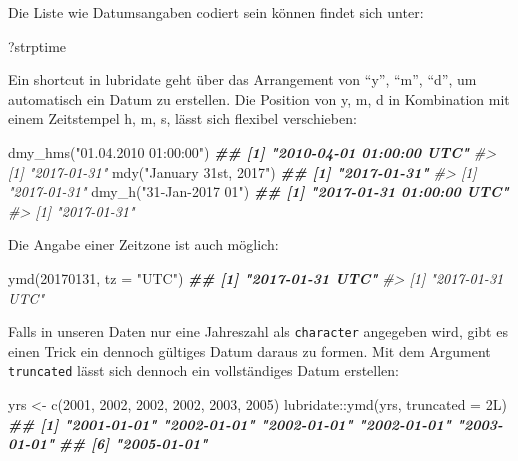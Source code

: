 \documentclass[
]{article}
\newenvironment{Shaded}{\begin{snugshade}}{\end{snugshade}}
\newcommand{\AttributeTok}[1]{\textcolor[rgb]{0.77,0.63,0.00}{#1}}
\newcommand{\CommentTok}[1]{\textcolor[rgb]{0.56,0.35,0.01}{\textit{#1}}}
\newcommand{\DecValTok}[1]{\textcolor[rgb]{0.00,0.00,0.81}{#1}}
\newcommand{\DocumentationTok}[1]{\textcolor[rgb]{0.56,0.35,0.01}{\textbf{\textit{#1}}}}
\newcommand{\FunctionTok}[1]{\textcolor[rgb]{0.00,0.00,0.00}{#1}}
\newcommand{\NormalTok}[1]{#1}
\newcommand{\OtherTok}[1]{\textcolor[rgb]{0.56,0.35,0.01}{#1}}
\newcommand{\SpecialCharTok}[1]{\textcolor[rgb]{0.00,0.00,0.00}{#1}}
\newcommand{\StringTok}[1]{\textcolor[rgb]{0.31,0.60,0.02}{#1}}
\begin{document}
Die Liste wie Datumsangaben codiert sein können findet sich unter:

\begin{Shaded}
\begin{Highlighting}[]
\NormalTok{?strptime}
\end{Highlighting}
\end{Shaded}

Ein shortcut in lubridate geht über das Arrangement von ``y'', ``m'', ``d'', um automatisch ein Datum zu erstellen. Die Position von y, m, d in Kombination mit einem Zeitstempel h, m, s, lässt sich flexibel verschieben:

\begin{Shaded}
\begin{Highlighting}[]
\FunctionTok{dmy\_hms}\NormalTok{(}\StringTok{"01.04.2010 01:00:00"}\NormalTok{)}
\DocumentationTok{\#\# [1] "2010{-}04{-}01 01:00:00 UTC"}
\CommentTok{\#\textgreater{} [1] "2017{-}01{-}31"}
\FunctionTok{mdy}\NormalTok{(}\StringTok{"January 31st, 2017"}\NormalTok{)}
\DocumentationTok{\#\# [1] "2017{-}01{-}31"}
\CommentTok{\#\textgreater{} [1] "2017{-}01{-}31"}
\FunctionTok{dmy\_h}\NormalTok{(}\StringTok{"31{-}Jan{-}2017 01"}\NormalTok{)}
\DocumentationTok{\#\# [1] "2017{-}01{-}31 01:00:00 UTC"}
\CommentTok{\#\textgreater{} [1] "2017{-}01{-}31"}
\end{Highlighting}
\end{Shaded}

Die Angabe einer Zeitzone ist auch möglich:

\begin{Shaded}
\begin{Highlighting}[]
\FunctionTok{ymd}\NormalTok{(}\DecValTok{20170131}\NormalTok{, }\AttributeTok{tz =} \StringTok{"UTC"}\NormalTok{)}
\DocumentationTok{\#\# [1] "2017{-}01{-}31 UTC"}
\CommentTok{\#\textgreater{} [1] "2017{-}01{-}31 UTC"}
\end{Highlighting}
\end{Shaded}

Falls in unseren Daten nur eine Jahreszahl als \texttt{character} angegeben wird, gibt es einen Trick ein dennoch gültiges Datum daraus zu formen. Mit dem Argument \texttt{truncated} lässt sich dennoch ein vollständiges Datum erstellen:

\begin{Shaded}
\begin{Highlighting}[]
\NormalTok{yrs }\OtherTok{\textless{}{-}} \FunctionTok{c}\NormalTok{(}\DecValTok{2001}\NormalTok{, }\DecValTok{2002}\NormalTok{, }\DecValTok{2002}\NormalTok{, }\DecValTok{2002}\NormalTok{, }\DecValTok{2003}\NormalTok{, }\DecValTok{2005}\NormalTok{)}
\NormalTok{lubridate}\SpecialCharTok{::}\FunctionTok{ymd}\NormalTok{(yrs, }\AttributeTok{truncated =}\NormalTok{ 2L)}
\DocumentationTok{\#\# [1] "2001{-}01{-}01" "2002{-}01{-}01" "2002{-}01{-}01" "2002{-}01{-}01" "2003{-}01{-}01"}
\DocumentationTok{\#\# [6] "2005{-}01{-}01"}
\end{Highlighting}
\end{Shaded}
\end{document}
